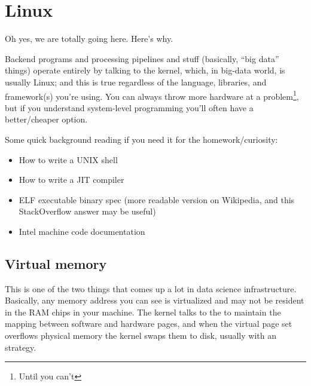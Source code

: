 \section{Linux}
Oh yes, we are totally going here. Here's why.

Backend programs and processing pipelines and stuff (basically, ``big data''
things) operate entirely by talking to the kernel, which, in big-data world,
is usually Linux; and this is true regardless of the language, libraries, and
framework(s) you're using. You can always throw more hardware at a
problem\footnote{Until you can't}, but if you understand system-level
programming you'll often have a better/cheaper option.

Some quick background reading if you need it for the homework/curiosity:

\begin{itemize}
  \item {}
            {How to write a UNIX shell}
  \item {}
            {How to write a JIT compiler}
  \item {}
            {ELF executable binary spec} (more readable version
            {on Wikipedia}, and
                {this StackOverflow answer} may be useful)
  \item {}
            {Intel machine code documentation}
\end{itemize}

\subsection{Virtual memory}
This is one of the two things that comes up a lot in data science
infrastructure. Basically, any memory address you can see is virtualized and
may not be resident in the RAM chips in your machine. The kernel talks to the
 to
maintain the mapping between software and hardware pages, and when the virtual
page set overflows physical memory the kernel swaps them to disk, usually with
an 
strategy.

